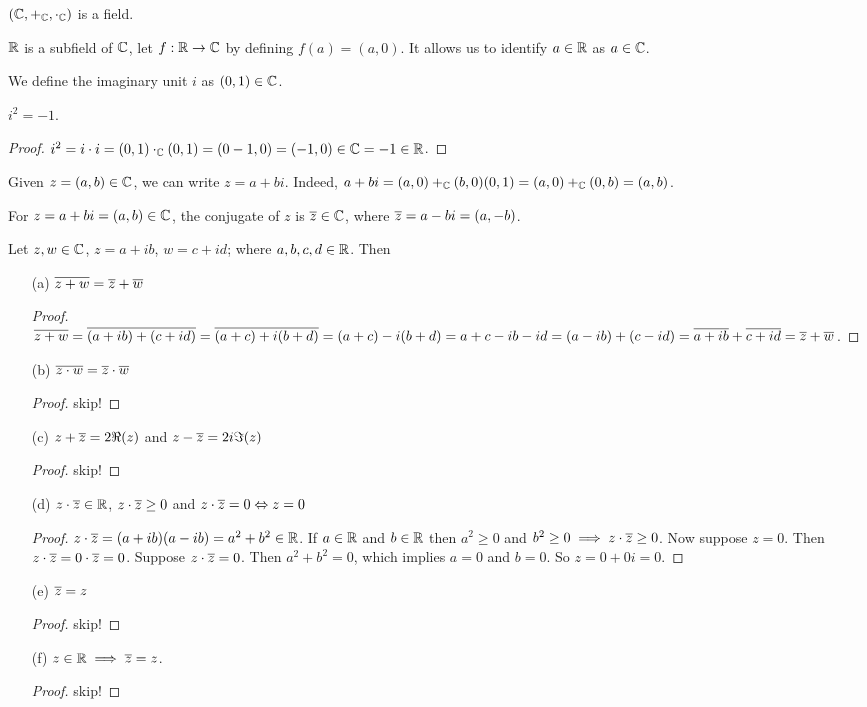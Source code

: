 \documentclass[]{article}
\begin{document}
\begin{recall}
	$(\mathbb{C},+_{\mathbb{C}},\cdot_{\mathbb{C}})$ is a field.
\end{recall}
\begin{note}
	$\mathbb{R}$ is a subfield of $\mathbb{C}$, let $f:\mathbb{R}\rightarrow \mathbb{C}$ by defining $f(a) = (a,0)$. It allows us to identify $a\in\mathbb{R}$ as $a\in\mathbb{C}$.
\end{note}
\begin{definition}
	[\say{$i$}] We define the imaginary unit $i$ as $(0,1)\in\mathbb{C}$.
\end{definition}
\begin{theorem}
	$i^2 = -1$.
\end{theorem}
\begin{proof}
	$i^2 = i\cdot i = (0,1)\cdot_{\mathbb{C}}(0,1) = (0-1,0) = (-1,0)\in\mathbb{C} = -1\in\mathbb{R}$.
\end{proof}
Given $z=(a,b)\in\mathbb{C}$, we can write $z = a+bi$. Indeed, $a+bi = (a,0) +_{\mathbb{C}} (b,0)(0,1) = (a,0)+_{\mathbb{C}}(0,b) = (a,b)$.
\begin{definition}
	[Conjugate] For $z = a+bi = (a,b)\in\mathbb{C}$, the conjugate of $z$ is $\overline{z}\in\mathbb{C}$, where $\overline{z} = a-bi = (a,-b)$.
\end{definition}
\begin{theorem}
	[Conjugate] Let $z,w\in\mathbb{C}$, $z = a+ib$, $w = c+id$; where $a,b,c,d\in\mathbb{R}$. Then
	\begin{enumerate}
		\item[(a)] $\overline{z+w} = \overline{z}+\overline{w}$
		\begin{proof}
			$\overline{z+w} = \overline{(a+ib)+(c+id)} = \overline{(a+c)+i(b+d)} = (a+c)-i(b+d) = a+c-ib-id = (a-ib)+(c-id) = \overline{a+ib} + \overline{c+id} = \overline{z} + \overline{w}$.
		\end{proof}
		\item[(b)] $\overline{z\cdot w} = \overline{z}\cdot \overline{w}$
		\begin{proof}
			skip!
		\end{proof}
		\item[(c)] $z+\overline{z} = 2\Re(z)$ and $z-\overline{z} = 2i\Im(z)$
		\begin{proof}
			skip!
		\end{proof}
		\item[(d)] $z\cdot \overline{z}\in\mathbb{R}$, $z\cdot \overline{z} \geq 0$ and $z\cdot\overline{z} = 0 \Leftrightarrow z = 0$
		\begin{proof}
			$z\cdot \overline{z} = (a+ib)(a-ib) = a^2+b^2\in\mathbb{R}$. If $a\in\mathbb{R}$ and $b\in\mathbb{R}$ then $a^2\geq 0$ and $b^2\geq 0 \implies z\cdot \overline{z} \geq 0$. Now suppose $z = 0$. Then $z\cdot \overline{z} = 0\cdot \overline{z} = 0$. Suppose $z\cdot \overline{z} = 0$. Then $a^2+b^2 = 0$, which implies $a=0$ and $b=0$. So $z = 0+0i = 0$.
		\end{proof}
		\item[(e)] $\overline{z} = z$
		\begin{proof}
			skip!
		\end{proof}
		\item[(f)] $z\in\mathbb{R} \implies \overline{z} = z$.
		\begin{proof}
			skip!
		\end{proof}
	\end{enumerate}
\end{theorem}
\end{document}
